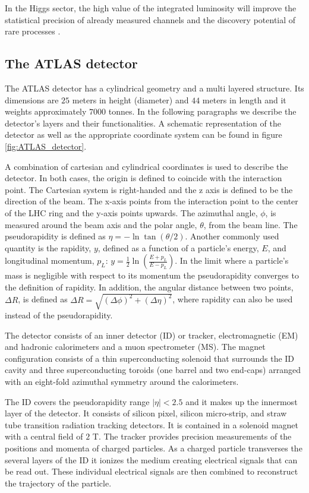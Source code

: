 In the Higgs sector, the high value of the integrated luminosity will improve the statistical precision of already measured channels and the discovery potential of rare processes \cite{HL_LHC}.

\subsection{The ATLAS detector}
\label{section:ATLAS}

The ATLAS detector has a cylindrical geometry and a multi layered structure. Its dimensions are $25$ meters in height (diameter) and $44$ meters in length and it weights approximately $7000$ tonnes. In the following paragraphs we describe the detector's layers and their functionalities. A schematic representation of the detector as well as the appropriate coordinate system can be found in figure \ref{fig:ATLAS_detector}.

A combination of cartesian and cylindrical coordinates is used to describe the detector. In both cases, the origin is defined to coincide with the interaction point. The Cartesian system is right-handed and the z axis is defined to be the direction of the beam. The x-axis points from the interaction point to the center of the LHC ring and the y-axis points upwards. The azimuthal angle, $\phi$, is measured around the beam axis and the polar angle, $\theta$, from the beam line. The pseudorapidity is defined as $\eta=-\ln \tan(\theta/2)$. Another commonly used quantity is the rapidity, $y$, defined as a function of a particle's energy, $E$, and longitudinal momentum, $p_L$: $y=\frac{1}{2}\ln \left(\frac{E+p_L}{E-p_L}\right)$. In the limit where a particle's mass is negligible with respect to its momentum the pseudorapidity converges to the definition of rapidity. In addition, the angular distance between two points, $\Delta R$, is defined as $\Delta R=\sqrt{(\Delta \phi)^2+(\Delta \eta)^2}$, where rapidity can also be used instead of the pseudorapidity. 

The detector consists of an inner detector (ID) or tracker, electromagnetic (EM) and hadronic calorimeters and a muon spectrometer (MS).
The magnet configuration consists of a thin superconducting solenoid that surrounds the ID cavity and three superconducting toroids (one barrel and two end-caps) arranged with an eight-fold azimuthal symmetry around the calorimeters.

The ID covers the pseudorapidity range $|\eta|<2.5$ and it makes up the innermost layer of the detector. It consists of silicon pixel, silicon micro-strip, and straw tube transition radiation tracking detectors. It is contained in a solenoid magnet with a central field of $2$ T. The tracker provides precision measurements of the positions and momenta of charged particles. As a charged particle transverses the several layers of the ID it ionizes the medium creating electrical signals that can be read out. These individual electrical signals are then combined to reconstruct the trajectory of the particle. 

